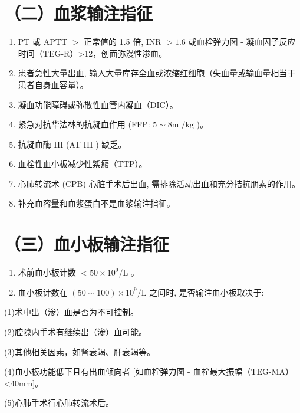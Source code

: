 \documentclass[10pt]{article}
\begin{document}
\section*{（二）血浆输注指征}
\begin{enumerate}
  \item PT 或 APTT $>$ 正常值的 1.5 倍, INR $>1.6$ 或血栓弹力图 - 凝血因子反应时间（TEG-R）>12，创面弥漫性渗血。

  \item 患者急性大量出血, 输人大量库存全血或浓缩红细胞（失血量或输血量相当于患者自身血容量）。

  \item 凝血功能障碍或弥散性血管内凝血（DIC）。

  \item 紧急对抗华法林的抗凝血作用 (FFP: $5 \sim 8 \mathrm{ml} / \mathrm{kg}$ )。

  \item 抗凝血酶 III (AT III ) 缺乏。

  \item 血栓性血小板减少性紫癜（TTP）。

  \item 心肺转流术 (CPB) 心脏手术后出血, 需排除活动出血和充分拮抗朋素的作用。

  \item 补充血容量和血浆蛋白不是血浆输注指征。

\end{enumerate}

\section*{（三）血小板输注指征}
\begin{enumerate}
  \item 术前血小板计数 $<50 \times 10^{9} / \mathrm{L}$ 。

  \item 血小板计数在 $(50 \sim 100) \times 10^{9} / \mathrm{L}$ 之间时, 是否输注血小板取决于:

\end{enumerate}

(1)术中出（渗）血是否为不可控制。

(2)腔隙内手术有继续出（渗）血可能。

(3)其他相关因素，如肾衰竭、肝衰竭等。

(4)血小板功能低下且有出血倾向者 [如血栓弹力图 - 血栓最大振幅（TEG-MA）<40mm]。

(5)心肺手术行心肺转流术后。
\end{document}
